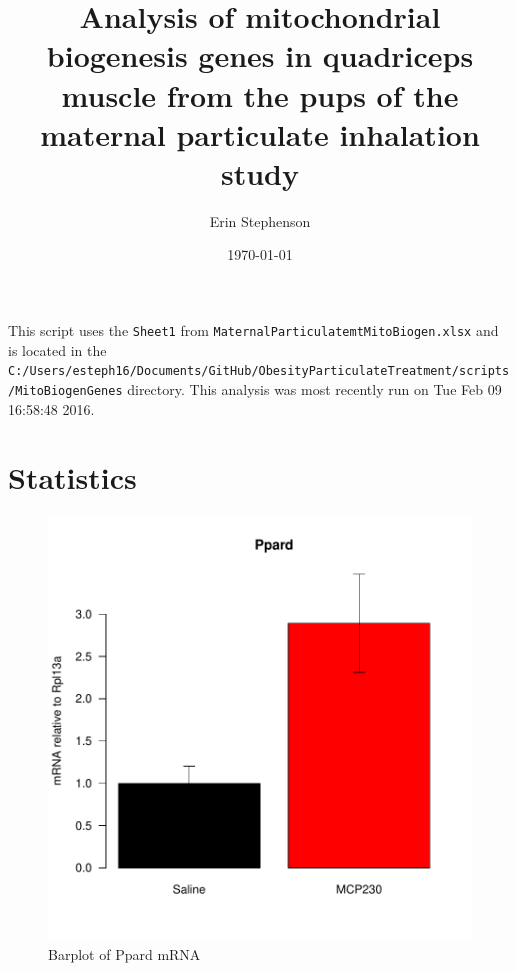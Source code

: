 \documentclass{article}
\begin{document}


\title{Analysis of mitochondrial biogenesis genes in quadriceps muscle from the pups of the maternal particulate inhalation study}
\author{Erin Stephenson}
\date{\today}
\maketitle

This script uses the \verb+Sheet1+ from \verb+MaternalParticulatemtMitoBiogen.xlsx+ and is located in the \verb+C:/Users/esteph16/Documents/GitHub/ObesityParticulateTreatment/scripts/MitoBiogenGenes+ directory.  This analysis was most recently run on Tue Feb 09 16:58:48 2016.  

\section*{Statistics}
\begin{figure}
\begin{center}
\includegraphics{MaternalParticulateMitoBiogen-barplotPpard}
\end{center}
\caption{Barplot of Ppard mRNA}
\label{fig:barplotPpard}
\end{figure}
\end{document}
